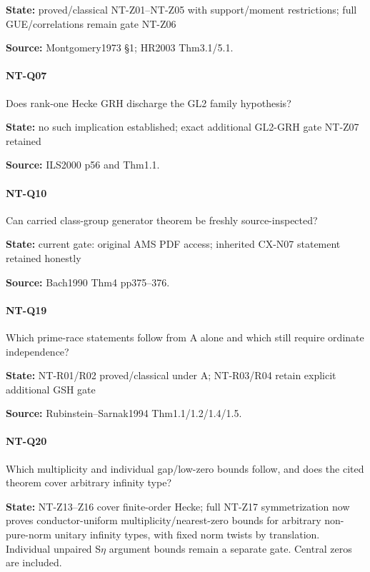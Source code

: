\documentclass[11pt,a4paper]{article}
\begin{document}
\textbf{State:} proved/\allowbreak{}classical NT-Z01–\allowbreak{}NT-Z05 with support/\allowbreak{}moment restrictions; full GUE/\allowbreak{}correlations remain gate NT-Z06

\textbf{Source:} Montgomery1973 §1; HR2003 Thm3.\allowbreak{}1/\allowbreak{}5.\allowbreak{}1.

\paragraph{NT-Q07} Does rank-one Hecke GRH discharge the GL2 family hypothesis?

\textbf{State:} no such implication established; exact additional GL2-GRH gate NT-Z07 retained

\textbf{Source:} ILS2000 p56 and Thm1.\allowbreak{}1.

\paragraph{NT-Q10} Can carried class-group generator theorem be freshly source-inspected?

\textbf{State:} current gate:\allowbreak{} original AMS PDF access; inherited CX-N07 statement retained honestly

\textbf{Source:} Bach1990 Thm4 pp375–\allowbreak{}376.

\paragraph{NT-Q19} Which prime-race statements follow from A alone and which still require ordinate independence?

\textbf{State:} NT-R01/\allowbreak{}R02 proved/\allowbreak{}classical under A; NT-R03/\allowbreak{}R04 retain explicit additional GSH gate

\textbf{Source:} Rubinstein–\allowbreak{}Sarnak1994 Thm1.\allowbreak{}1/\allowbreak{}1.\allowbreak{}2/\allowbreak{}1.\allowbreak{}4/\allowbreak{}1.\allowbreak{}5.

\paragraph{NT-Q20} Which multiplicity and individual gap/\allowbreak{}low-zero bounds follow, and does the cited theorem cover arbitrary infinity type?

\textbf{State:} NT-Z13–\allowbreak{}Z16 cover finite-order Hecke; full NT-Z17 symmetrization now proves conductor-uniform multiplicity/\allowbreak{}nearest-zero bounds for arbitrary non-pure-norm unitary infinity types, with fixed norm twists by translation.\allowbreak{} Individual unpaired S\ensuremath{\eta} argument bounds remain a separate gate.\allowbreak{} Central zeros are included.\allowbreak{}
\end{document}
